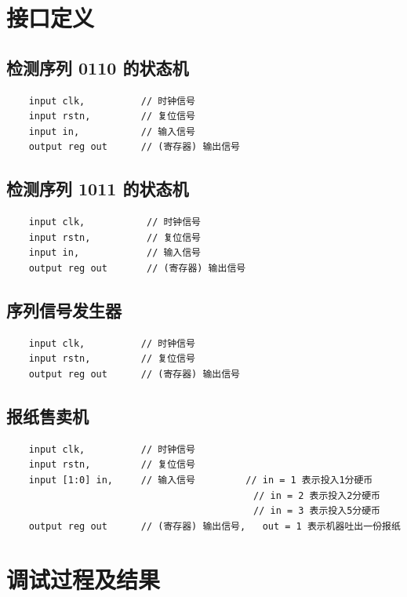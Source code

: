 \documentclass{article}
\begin{document}
\section{接口定义}

\subsection{检测序列 0110 的状态机}

\begin{lstlisting}
    input clk,          // 时钟信号
    input rstn,         // 复位信号
    input in,           // 输入信号
    output reg out      // (寄存器) 输出信号
\end{lstlisting}

\subsection{检测序列 1011 的状态机}

\begin{lstlisting}
    input clk,           // 时钟信号
    input rstn,          // 复位信号
    input in,            // 输入信号
    output reg out       // (寄存器) 输出信号
\end{lstlisting}

\subsection{序列信号发生器}

\begin{lstlisting}  
    input clk,          // 时钟信号
    input rstn,         // 复位信号
    output reg out      // (寄存器) 输出信号
\end{lstlisting}

\subsection{报纸售卖机}

\begin{lstlisting}
    input clk,          // 时钟信号
    input rstn,         // 复位信号
    input [1:0] in,     // 输入信号         // in = 1 表示投入1分硬币
                                            // in = 2 表示投入2分硬币
                                            // in = 3 表示投入5分硬币
    output reg out      // (寄存器) 输出信号,   out = 1 表示机器吐出一份报纸
\end{lstlisting}


\section{调试过程及结果}
\end{document}

